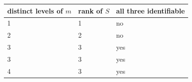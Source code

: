 \begin{tabular}{@{}lll@{}}
\toprule
\textbf{distinct levels of $m$} & \textbf{rank of $S$} & \textbf{all three identifiable} \\
\midrule
1 & 1 & no \\
2 & 2 & no \\
3 & 3 & yes \\
3 & 3 & yes \\
4 & 3 & yes \\
\bottomrule
\end{tabular}
